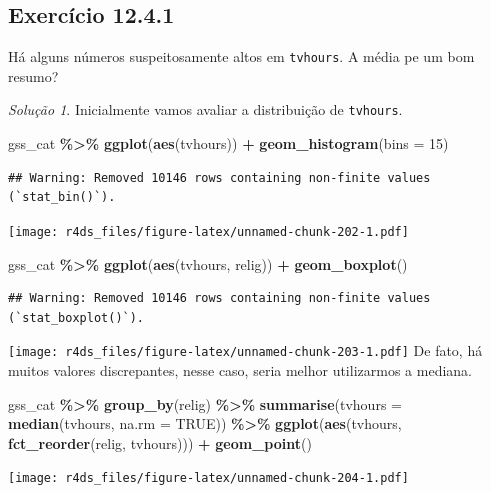 \documentclass[
]{latex/krantz}
\newenvironment{Shaded}{\begin{snugshade}}{\end{snugshade}}
\newcommand{\AttributeTok}[1]{\textcolor[rgb]{0.13,0.29,0.53}{#1}}
\newcommand{\ConstantTok}[1]{\textcolor[rgb]{0.56,0.35,0.01}{#1}}
\newcommand{\DecValTok}[1]{\textcolor[rgb]{0.00,0.00,0.81}{#1}}
\newcommand{\FunctionTok}[1]{\textcolor[rgb]{0.13,0.29,0.53}{\textbf{#1}}}
\newcommand{\NormalTok}[1]{#1}
\newcommand{\SpecialCharTok}[1]{\textcolor[rgb]{0.81,0.36,0.00}{\textbf{#1}}}
\theoremstyle{definition}
\theoremstyle{definition}
\theoremstyle{definition}
\theoremstyle{definition}
\theoremstyle{remark}
\newtheorem*{solution}{Solução}
\begin{document}
\hypertarget{exr12-4-1}{%
\subsection*{Exercício 12.4.1}\label{exr12-4-1}}

Há alguns números suspeitosamente altos em \texttt{tvhours}. A média pe um bom resumo?

\begin{solution}
Inicialmente vamos avaliar a distribuição de \texttt{tvhours}.

\begin{Shaded}
\begin{Highlighting}[]
\NormalTok{gss\_cat }\SpecialCharTok{\%\textgreater{}\%}
  \FunctionTok{ggplot}\NormalTok{(}\FunctionTok{aes}\NormalTok{(tvhours)) }\SpecialCharTok{+}
    \FunctionTok{geom\_histogram}\NormalTok{(}\AttributeTok{bins =} \DecValTok{15}\NormalTok{)}
\end{Highlighting}
\end{Shaded}

\begin{verbatim}
## Warning: Removed 10146 rows containing non-finite values (`stat_bin()`).
\end{verbatim}

\texttt{[image: r4ds\_files/figure-latex/unnamed-chunk-202-1.pdf]}

\begin{Shaded}
\begin{Highlighting}[]
\NormalTok{gss\_cat }\SpecialCharTok{\%\textgreater{}\%}
  \FunctionTok{ggplot}\NormalTok{(}\FunctionTok{aes}\NormalTok{(tvhours, relig)) }\SpecialCharTok{+}
    \FunctionTok{geom\_boxplot}\NormalTok{()}
\end{Highlighting}
\end{Shaded}

\begin{verbatim}
## Warning: Removed 10146 rows containing non-finite values (`stat_boxplot()`).
\end{verbatim}

\texttt{[image: r4ds\_files/figure-latex/unnamed-chunk-203-1.pdf]}
De fato, há muitos valores discrepantes, nesse caso, seria melhor utilizarmos a mediana.

\begin{Shaded}
\begin{Highlighting}[]
\NormalTok{gss\_cat }\SpecialCharTok{\%\textgreater{}\%}
  \FunctionTok{group\_by}\NormalTok{(relig) }\SpecialCharTok{\%\textgreater{}\%}
  \FunctionTok{summarise}\NormalTok{(}\AttributeTok{tvhours =} \FunctionTok{median}\NormalTok{(tvhours, }\AttributeTok{na.rm =} \ConstantTok{TRUE}\NormalTok{)) }\SpecialCharTok{\%\textgreater{}\%}
  \FunctionTok{ggplot}\NormalTok{(}\FunctionTok{aes}\NormalTok{(tvhours, }\FunctionTok{fct\_reorder}\NormalTok{(relig, tvhours))) }\SpecialCharTok{+}
  \FunctionTok{geom\_point}\NormalTok{()}
\end{Highlighting}
\end{Shaded}

\texttt{[image: r4ds\_files/figure-latex/unnamed-chunk-204-1.pdf]}
\end{solution}
\end{document}
